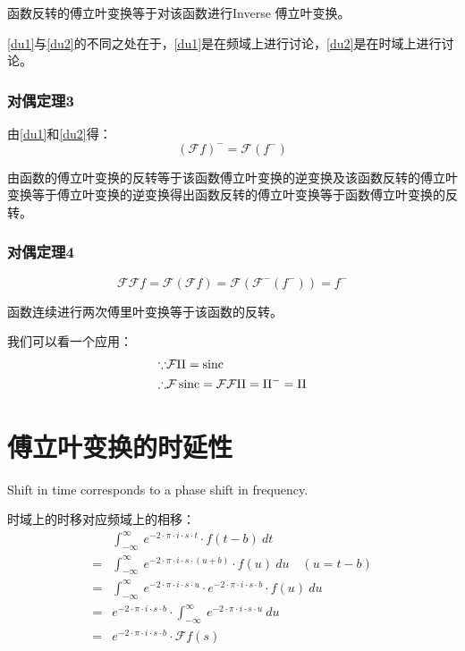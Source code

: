 函数反转的傅立叶变换等于对该函数进行Inverse 傅立叶变换。

\ref{du1}与\ref{du2}的不同之处在于，\ref{du1}是在频域上进行讨论，\ref{du2}是在时域上进行讨论。
\subsubsection{对偶定理3}
由\ref{du1}和\ref{du2}得：
\begin{equation}\label{du3}
	(\mathcal{F}f)^-=\mathcal{F}(f^-)
\end{equation}

由函数的傅立叶变换的反转等于该函数傅立叶变换的逆变换及该函数反转的傅立叶变换等于傅立叶变换的逆变换得出函数反转的傅立叶变换等于函数傅立叶变换的反转。
\subsubsection{对偶定理4}
\begin{equation}
	\mathcal{F}\mathcal{F}f= \mathcal{F}(\mathcal{F}f)=\mathcal{F}(\mathcal{F}^-(f^-)) =  f^-
\end{equation}

函数连续进行两次傅里叶变换等于该函数的反转。

我们可以看一个应用：
\begin{align*}
	\because   & \mathcal{F}\Pi=\operatorname{sinc}                                 \\
	\therefore & \mathcal{F}\operatorname{sinc}=\mathcal{F}\mathcal{F}\Pi=\Pi^-=\Pi
\end{align*}

\section{傅立叶变换的时延性}
Shift in time corresponds to a phase shift in frequency.

时域上的时移对应频域上的相移：
\begin{align*}
	  & \int_{-\infty}^{\infty}\ e^{-2\cdot \pi\cdot i\cdot s\cdot t}\cdot f(t-b)\ dt                                         \\
	= & \int_{-\infty}^{\infty}\ e^{-2\cdot \pi\cdot i\cdot s\cdot (u+b)}\cdot f(u)\ du\quad (u=t-b)                          \\
	= & \int_{-\infty}^{\infty}\ e^{-2\cdot \pi\cdot i\cdot s\cdot u}\cdot e^{-2\cdot \pi\cdot i\cdot s\cdot b}\cdot f(u)\ du \\
	= & e^{-2\cdot \pi\cdot i\cdot s\cdot b}\cdot \int_{-\infty}^{\infty}\ e^{-2\cdot \pi\cdot i\cdot s\cdot u}\ du           \\
	= & e^{-2\cdot \pi\cdot i\cdot s\cdot b}\cdot \mathcal{F}f(s)                                                             \\
\end{align*}


